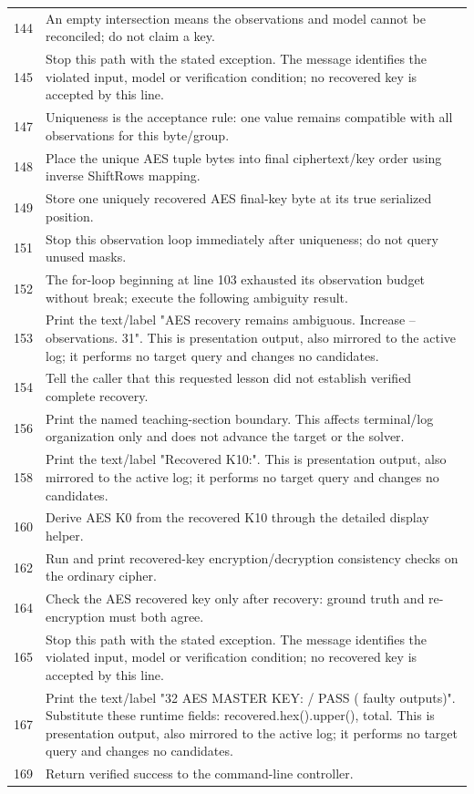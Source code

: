 \begin{longtable}{r >{\raggedright\arraybackslash}p{138mm}}
144&An empty intersection means the observations and model cannot be reconciled; do not claim a key.\\
145&Stop this path with the stated exception. The message identifies the violated input, model or verification condition; no recovered key is accepted by this line.\\
147&Uniqueness is the acceptance rule: one value remains compatible with all observations for this byte/group.\\
148&Place the unique AES tuple bytes into final ciphertext/key order using inverse ShiftRows mapping.\\
149&Store one uniquely recovered AES final-key byte at its true serialized position.\\
151&Stop this observation loop immediately after uniqueness; do not query unused masks.\\
152&The for-loop beginning at line 103 exhausted its observation budget without break; execute the following ambiguity result.\\
153&Print the text/label "AES recovery remains ambiguous. Increase --observations. 31". This is presentation output, also mirrored to the active log; it performs no target query and changes no candidates.\\
154&Tell the caller that this requested lesson did not establish verified complete recovery.\\
156&Print the named teaching-section boundary. This affects terminal/log organization only and does not advance the target or the solver.\\
158&Print the text/label "Recovered K10:". This is presentation output, also mirrored to the active log; it performs no target query and changes no candidates.\\
160&Derive AES K0 from the recovered K10 through the detailed display helper.\\
162&Run and print recovered-key encryption/decryption consistency checks on the ordinary cipher.\\
164&Check the AES recovered key only after recovery: ground truth and re-encryption must both agree.\\
165&Stop this path with the stated exception. The message identifies the violated input, model or verification condition; no recovered key is accepted by this line.\\
167&Print the text/label "32 AES MASTER KEY:   / PASS (  faulty outputs)". Substitute these runtime fields: recovered.hex().upper(), total. This is presentation output, also mirrored to the active log; it performs no target query and changes no candidates.\\
169&Return verified success to the command-line controller.\\
\bottomrule\end{longtable}\endgroup
